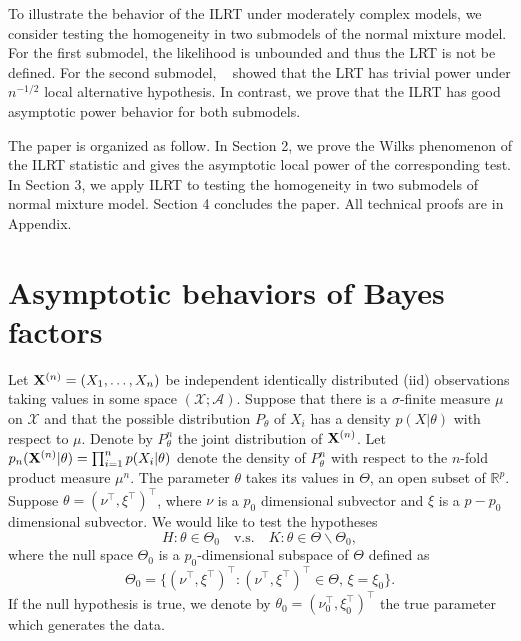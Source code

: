 \documentclass[11pt]{article}
\theoremstyle{plain}
\theoremstyle{definition}
\theoremstyle{remark}
\begin{document}
To illustrate the behavior of the ILRT under moderately complex models, we consider testing the homogeneity in two submodels of the normal mixture model.
For the first submodel, the likelihood is unbounded and thus the LRT is not be defined.
For the second submodel, %
~\cite{HALL2005158} showed that the LRT has trivial power under $n^{-1/2}$ local alternative hypothesis. 
In contrast, we prove that the ILRT has good asymptotic power behavior for both submodels.



The paper is organized as follow.
In Section 2, we prove the Wilks phenomenon of the ILRT statistic and gives the asymptotic local power of the corresponding test.
In Section 3, we apply ILRT to testing the homogeneity in two submodels of normal mixture model.
Section 4 concludes the paper.
All technical proofs are in Appendix.






\section{Asymptotic behaviors of Bayes factors}


Let $\mathbf{X}^{(n)}=(X_1,\ldots,X_n)$ be independent identically distributed (iid) observations taking values in some space $(\mathcal{X};\mathscr{A})$.
Suppose that there is a $\sigma$-finite measure $\mu$ on $\mathcal{X}$ and that the  possible distribution $P_\theta$ of $X_i$ has a density $p(X|\theta)$ with respect to $\mu$.
Denote by $P_{\theta}^{n}$ the joint distribution of $\mathbf{X}^{(n)}$.
Let $p_{n}(\mathbf{X}^{(n)}|\theta)=\prod_{i=1}^n p(X_i|\theta)$ denote the density of $P_{\theta}^n$ with respect to the $n$-fold product measure $\mu^n$.
The parameter $\theta$ takes its values in $\Theta$, an open subset of $\mathbb{R}^{p}$.
Suppose $\theta=(\nu^\top ,\xi^\top )^\top $, where $\nu$ is a $p_0$ dimensional subvector and $\xi$ is a $p-p_0$ dimensional subvector.
 We would like to test the hypotheses
\begin{equation*}
    H:\theta\in\Theta_0\quad \text{v.s.}\quad K:\theta\in\Theta\backslash \Theta_0,
\end{equation*}
where the null space $\Theta_0$ is a $p_0$-dimensional subspace of $\Theta$ defined as
\begin{equation*}
    \Theta_0=\{(\nu^\top ,\xi^\top )^\top :(\nu^\top ,\xi^\top )^\top \in\Theta, \, \xi=\xi_0\}.
\end{equation*}
If the null hypothesis is true, we denote by $\theta_0=(\nu_0^\top ,\xi_0^\top )^\top $ the true parameter which generates the data.
\end{document}
